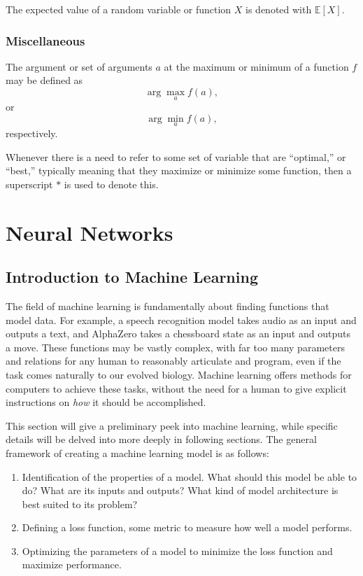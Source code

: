 \documentclass[12pt]{report}
\theoremstyle{definition}
\theoremstyle{remark}
\begin{document}
The expected value of a random variable or function $X$ is denoted with $\mathbb{E}[X]$.

\subsection{Miscellaneous}
The argument or set of arguments $a$ at the maximum or minimum of a function $f$ may be defined as
\begin{equation}
    \arg\max_a f(a),
\end{equation}
or
\begin{equation}
    \arg\min_a f(a),
\end{equation}
respectively.

Whenever there is a need to refer to some set of variable that are ``optimal,'' or ``best,'' typically meaning that they maximize or minimize some function, then a superscript $\ast$ is used to denote this.


\chapter{Neural Networks}
\section{Introduction to Machine Learning}
The field of machine learning is fundamentally about finding functions that model data. For example, a speech recognition model takes audio as an input and outputs a text, and AlphaZero takes a chessboard state as an input and outputs a move. These functions may be vastly complex, with far too many parameters and relations for any human to reasonably articulate and program, even if the task comes naturally to our evolved biology. Machine learning offers methods for computers to achieve these tasks, without the need for a human to give explicit instructions on \textit{how} it should be accomplished.

This section will give a preliminary peek into machine learning, while specific details will be delved into more deeply in following sections. The general framework of creating a machine learning model is as follows:

\begin{enumerate}
    \item Identification of the properties of a model. What should this model be able to do? What are its inputs and outputs? What kind of model architecture is best suited to its problem?
    \item Defining a loss function, some metric to measure how well a model performs.
    \item Optimizing the parameters of a model to minimize the loss function and maximize performance.
\end{enumerate}
\end{document}
